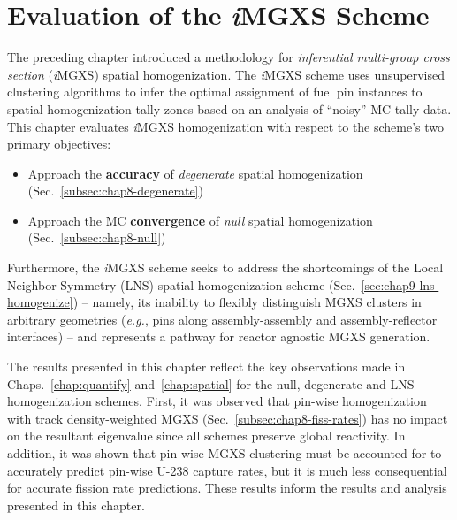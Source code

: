 \chapter{Evaluation of the \textit{i}MGXS Scheme}
\label{chap:results}

The preceding chapter introduced a methodology for \textit{inferential multi-group cross section} (\textit{i}\ac{MGXS}) spatial homogenization. The \textit{i}\ac{MGXS} scheme uses unsupervised clustering algorithms to infer the optimal assignment of fuel pin instances to spatial homogenization tally zones based on an analysis of ``noisy'' \ac{MC} tally data. This chapter evaluates \textit{i}\ac{MGXS} homogenization with respect to the scheme's two primary objectives:

\begin{itemize}[noitemsep]
\item Approach the \textbf{accuracy} of \textit{degenerate} spatial homogenization (Sec.~\ref{subsec:chap8-degenerate})
\item Approach the \ac{MC} \textbf{convergence} of \textit{null} spatial homogenization (Sec.~\ref{subsec:chap8-null})
\end{itemize}

\noindent Furthermore, the \textit{i}\ac{MGXS} scheme seeks to address the shortcomings of the Local Neighbor Symmetry (\ac{LNS}) spatial homogenization scheme (Sec.~\ref{sec:chap9-lns-homogenize}) -- namely, its inability to flexibly distinguish \ac{MGXS} clusters in arbitrary geometries (\textit{e.g.}, pins along assembly-assembly and assembly-reflector interfaces) -- and represents a pathway for reactor agnostic \ac{MGXS} generation.

The results presented in this chapter reflect the key observations made in Chaps.~\ref{chap:quantify} and~\ref{chap:spatial} for the null, degenerate and \ac{LNS} homogenization schemes. First, it was observed that pin-wise homogenization with track density-weighted \ac{MGXS} (Sec.~\ref{subsec:chap8-fiss-rates}) has no impact on the resultant eigenvalue since all schemes preserve global reactivity. In addition, it was shown that pin-wise \ac{MGXS} clustering must be accounted for to accurately predict pin-wise U-238 capture rates, but it is much less consequential for accurate fission rate predictions. These results inform the results and analysis presented in this chapter.

